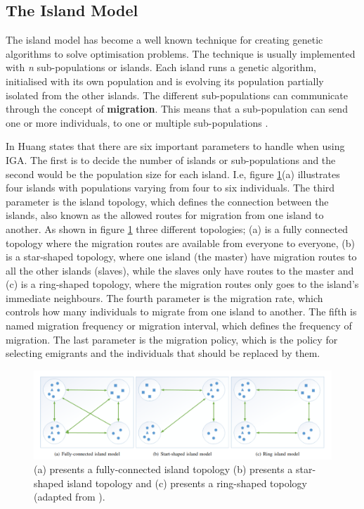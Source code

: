 \subsection{The Island Model}
\label{background:iga}
The island model has become a well known technique for creating genetic algorithms to solve optimisation problems. The technique is usually implemented with \textit{n} sub-populations or islands. Each island runs a genetic algorithm, initialised with its own population and is evolving its population partially isolated from the other islands. The different sub-populations can communicate through the concept of \textbf{migration}. This means that a sub-population can send one or more individuals, to one or multiple sub-populations \cite{IGA:separability_popuplation_size_and_convergence}.

In \cite{IGA:DGA-optimization-of-wind-farm} Huang states that there are six important parameters to handle when using IGA. The first is to decide the number of islands or sub-populations and the second would be the population size for each island. I.e, figure \ref{fig:iga:toplogies}(a) illustrates four islands with populations varying from four to six individuals. The third parameter is the island topology, which defines the connection between the islands, also known as the allowed routes for migration from one island to another. As shown in figure \ref{fig:iga:toplogies} three different topologies; (a) is a fully connected topology where the migration routes are available from everyone to everyone, (b) is a star-shaped topology, where one island (the master) have migration routes to all the other islands (slaves), while the slaves only have routes to the master and (c) is a ring-shaped topology, where the migration routes only goes to the island's immediate neighbours. The fourth parameter is the migration rate, which controls how many individuals to migrate from one island to another. The fifth is named migration frequency or migration interval, which defines the frequency of migration. The last parameter is the migration policy, which is the policy for selecting emigrants and the individuals that should be replaced by them. 

\label{fig:island-models}
\begin{figure}
    \centering
    \includegraphics[width=1.0\columnwidth]{figs/island-models.png}
    \caption[Island Topologies]
    {(a) presents a fully-connected island topology (b) presents a star-shaped island topology and (c) presents a ring-shaped topology
    (adapted from \cite{IGA:dynamic_im_based_on_spectral_clustering_in_ga}).}
    \label{fig:iga:toplogies}
\end{figure}

